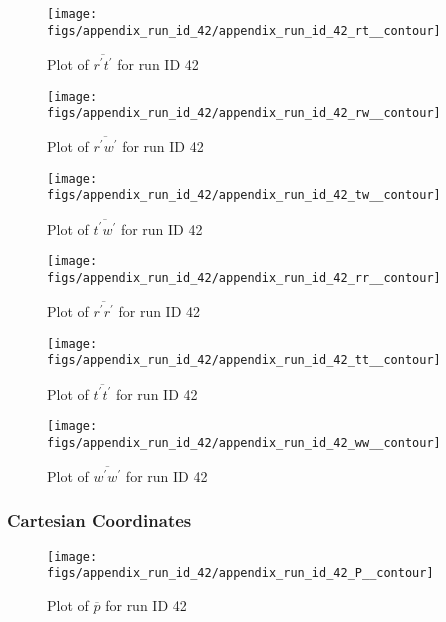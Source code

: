 \begin{figure}[H]
\centering
\texttt{[image: figs/appendix\_run\_id\_42/appendix\_run\_id\_42\_rt\_\_contour]}
\caption{Plot of $\overline{r^\prime t^\prime}$ for run ID 42}
\label{fig:appendix_run_id_42_rt__contour}
\end{figure}


\begin{figure}[H]
\centering
\texttt{[image: figs/appendix\_run\_id\_42/appendix\_run\_id\_42\_rw\_\_contour]}
\caption{Plot of $\overline{r^\prime w^\prime}$ for run ID 42}
\label{fig:appendix_run_id_42_rw__contour}
\end{figure}


\begin{figure}[H]
\centering
\texttt{[image: figs/appendix\_run\_id\_42/appendix\_run\_id\_42\_tw\_\_contour]}
\caption{Plot of $\overline{t^\prime w^\prime}$ for run ID 42}
\label{fig:appendix_run_id_42_tw__contour}
\end{figure}


\begin{figure}[H]
\centering
\texttt{[image: figs/appendix\_run\_id\_42/appendix\_run\_id\_42\_rr\_\_contour]}
\caption{Plot of $\overline{r^\prime r^\prime}$ for run ID 42}
\label{fig:appendix_run_id_42_rr__contour}
\end{figure}


\begin{figure}[H]
\centering
\texttt{[image: figs/appendix\_run\_id\_42/appendix\_run\_id\_42\_tt\_\_contour]}
\caption{Plot of $\overline{t^\prime t^\prime}$ for run ID 42}
\label{fig:appendix_run_id_42_tt__contour}
\end{figure}


\begin{figure}[H]
\centering
\texttt{[image: figs/appendix\_run\_id\_42/appendix\_run\_id\_42\_ww\_\_contour]}
\caption{Plot of $\overline{w^\prime w^\prime}$ for run ID 42}
\label{fig:appendix_run_id_42_ww__contour}
\end{figure}


\subsubsection{Cartesian Coordinates}
\begin{figure}[H]
\centering
\texttt{[image: figs/appendix\_run\_id\_42/appendix\_run\_id\_42\_P\_\_contour]}
\caption{Plot of $\overline{p}$ for run ID 42}
\label{fig:appendix_run_id_42_P__contour}
\end{figure}


